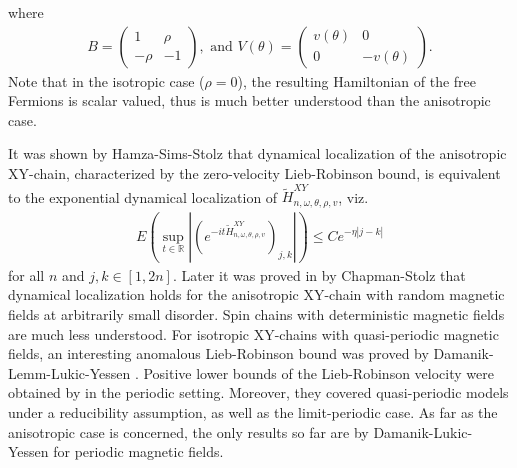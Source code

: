 \documentclass[11pt]{amsart}
\newcommand{\R}{\mathbb R}
\begin{document}
where 
\begin{align}
    B=\left(\begin{matrix}1 &\rho\\ -\rho &-1\end{matrix}\right), \text{ and } V(\theta)=\left(\begin{matrix} v(\theta) &0 \\ 0 &-v(\theta)\end{matrix}\right).
\end{align}
Note that in the isotropic case ($\rho=0$), the resulting Hamiltonian of the free Fermions is scalar valued, thus is much better understood than the anisotropic case. 

It was shown by Hamza-Sims-Stolz \cite{HSS} that dynamical localization of the anisotropic XY-chain, characterized by the zero-velocity Lieb-Robinson bound, is equivalent to the exponential dynamical localization of $\widetilde{H}^{XY}_{n,\omega,\theta,\rho,v}$, viz. 
\begin{align*}
E\left(\sup_{t\in \R} \left| (e^{-i t \widetilde{H}^{XY}_{n,\omega,\theta,\rho,v} })_{j,k}\right|\right)\leq C e^{-\eta |j-k|}
\end{align*}
for all $n$ and $j,k\in [1,2n]$. Later it was proved in \cite{CS} by Chapman-Stolz that dynamical localization holds for the anisotropic XY-chain with random magnetic fields at arbitrarily small disorder.
Spin chains with deterministic magnetic fields are much less understood.
For isotropic XY-chains with quasi-periodic magnetic fields, an interesting anomalous Lieb-Robinson bound was proved by Damanik-Lemm-Lukic-Yessen \cite{DLLY}. Positive lower bounds of the Lieb-Robinson velocity were obtained by \cite{DLY,Ka,Fi} in the periodic setting. Moreover, they covered  quasi-periodic models under a reducibility assumption, as well as the limit-periodic case. 
As far as the anisotropic case is concerned, the only results so far are by Damanik-Lukic-Yessen \cite{DLY} for periodic magnetic fields.
\end{document}
